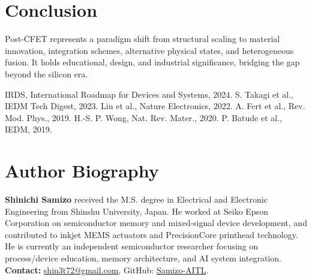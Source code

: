 \documentclass[conference]{IEEEtran}
\begin{document}
\section{Conclusion}
Post-CFET represents a paradigm shift from structural scaling to material innovation, integration schemes, alternative physical states, and heterogeneous fusion.  
It holds educational, design, and industrial significance, bridging the gap beyond the silicon era.

\begin{thebibliography}{00}
 IRDS, International Roadmap for Devices and Systems, 2024.
 S. Takagi et al., IEDM Tech Digest, 2023.
 Liu et al., Nature Electronics, 2022.
 A. Fert et al., Rev. Mod. Phys., 2019.
 H.-S. P. Wong, Nat. Rev. Mater., 2020.
 P. Batude et al., IEDM, 2019.
\end{thebibliography}

\section*{Author Biography}
\noindent\textbf{Shinichi Samizo}
received the M.S. degree in Electrical and Electronic Engineering from Shinshu University, Japan.
He worked at Seiko Epson Corporation on semiconductor memory and mixed-signal device development, and contributed to inkjet MEMS actuators and PrecisionCore printhead technology.
He is currently an independent semiconductor researcher focusing on process/device education, memory architecture, and AI system integration.\\
\textbf{Contact:} \href{mailto:shin3t72@gmail.com}{shin3t72@gmail.com}, GitHub: \href{https://github.com/Samizo-AITL}{Samizo-AITL}.
\end{document}
